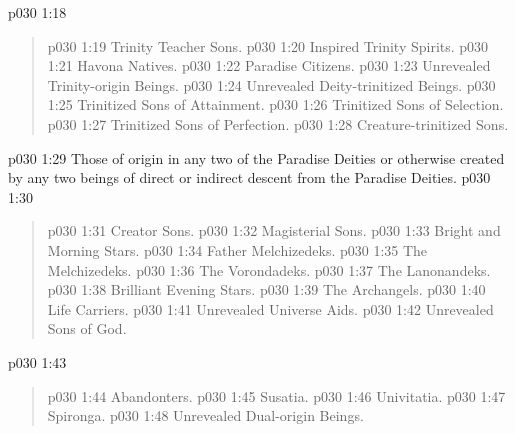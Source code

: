 \vsetspace
\vs p030 1:18 \bibnobreakspace {}
\begin{quote}
\vs p030 1:19 \bibnobreakspace Trinity Teacher Sons.
\vs p030 1:20 \bibnobreakspace Inspired Trinity Spirits.
\vs p030 1:21 \bibnobreakspace Havona Natives.
\vs p030 1:22 \bibnobreakspace Paradise Citizens.
\vs p030 1:23 \bibnobreakspace Unrevealed Trinity\hyp{}origin Beings.
\vs p030 1:24 \bibnobreakspace Unrevealed Deity\hyp{}trinitized Beings.
\vs p030 1:25 \bibnobreakspace Trinitized Sons of Attainment.
\vs p030 1:26 \bibnobreakspace Trinitized Sons of Selection.
\vs p030 1:27 \bibnobreakspace Trinitized Sons of Perfection.
\vs p030 1:28 \bibnobreakspace Creature\hyp{}trinitized Sons.
\end{quote}
\vsetspace
\vs p030 1:29 \bibnobreakspace {} Those of origin in any two of the Paradise Deities or otherwise created by any two beings of direct or indirect descent from the Paradise Deities.
\vsetspace
\vs p030 1:30 \bibnobreakspace {}
\begin{quote}
\vs p030 1:31 \bibnobreakspace Creator Sons.
\vs p030 1:32 \bibnobreakspace Magisterial Sons.
\vs p030 1:33 \bibnobreakspace Bright and Morning Stars.
\vs p030 1:34 \bibnobreakspace Father Melchizedeks.
\vs p030 1:35 \bibnobreakspace The Melchizedeks.
\vs p030 1:36 \bibnobreakspace The Vorondadeks.
\vs p030 1:37 \bibnobreakspace The Lanonandeks.
\vs p030 1:38 \bibnobreakspace Brilliant Evening Stars.
\vs p030 1:39 \bibnobreakspace The Archangels.
\vs p030 1:40 \bibnobreakspace Life Carriers.
\vs p030 1:41 \bibnobreakspace Unrevealed Universe Aids.
\vs p030 1:42 \bibnobreakspace Unrevealed Sons of God.
\end{quote}
\vsetspace
\vs p030 1:43 \bibnobreakspace {}
\begin{quote}
\vs p030 1:44 \bibnobreakspace Abandonters.
\vs p030 1:45 \bibnobreakspace Susatia.
\vs p030 1:46 \bibnobreakspace Univitatia.
\vs p030 1:47 \bibnobreakspace Spironga.
\vs p030 1:48 \bibnobreakspace Unrevealed Dual\hyp{}origin Beings.
\end{quote}
